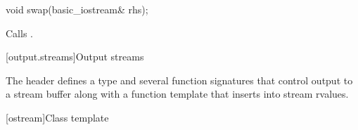 %
\begin{itemdecl}
void swap(basic_iostream& rhs);
\end{itemdecl}

\begin{itemdescr}
\pnum
\effects Calls .
\end{itemdescr}


[output.streams]{Output streams}

\pnum
The header
defines a type
and several function signatures that control output to a
stream buffer along with a function template that inserts into stream rvalues.

[ostream]{Class template }

%
